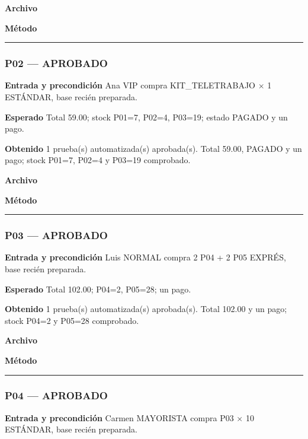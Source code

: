 \textbf{Archivo} \href{https://github.com/Alan77-bot/LogiMarket360Alan/blob/68bda51063441415524ede51bdf61649ee9b4973/tests/LogiMarket.Tests/Integracion/MigracionesTests.cs}{}

\textbf{Método} 

\medskip\hrule\medskip
\subsubsection*{P02 --- APROBADO}
\textbf{Entrada y precondición} Ana VIP compra KIT\_TELETRABAJO  $\times$ 1 ESTÁNDAR, base recién preparada.

\textbf{Esperado} Total 59.00; stock P01=7, P02=4, P03=19; estado PAGADO y un pago.

\textbf{Obtenido} 1 prueba(s) automatizada(s) aprobada(s). Total 59.00, PAGADO y un pago; stock P01=7, P02=4 y P03=19 comprobado.

\textbf{Archivo} \href{https://github.com/Alan77-bot/LogiMarket360Alan/blob/68bda51063441415524ede51bdf61649ee9b4973/tests/LogiMarket.Tests/Aceptacion/CasosOficialesTests.cs}{}

\textbf{Método} 

\medskip\hrule\medskip
\subsubsection*{P03 --- APROBADO}
\textbf{Entrada y precondición} Luis NORMAL compra 2 P04 + 2 P05 EXPRÉS, base recién preparada.

\textbf{Esperado} Total 102.00; P04=2, P05=28; un pago.

\textbf{Obtenido} 1 prueba(s) automatizada(s) aprobada(s). Total 102.00 y un pago; stock P04=2 y P05=28 comprobado.

\textbf{Archivo} \href{https://github.com/Alan77-bot/LogiMarket360Alan/blob/68bda51063441415524ede51bdf61649ee9b4973/tests/LogiMarket.Tests/Aceptacion/CasosOficialesTests.cs}{}

\textbf{Método} 

\medskip\hrule\medskip
\subsubsection*{P04 --- APROBADO}
\textbf{Entrada y precondición} Carmen MAYORISTA compra P03  $\times$ 10 ESTÁNDAR, base recién preparada.

